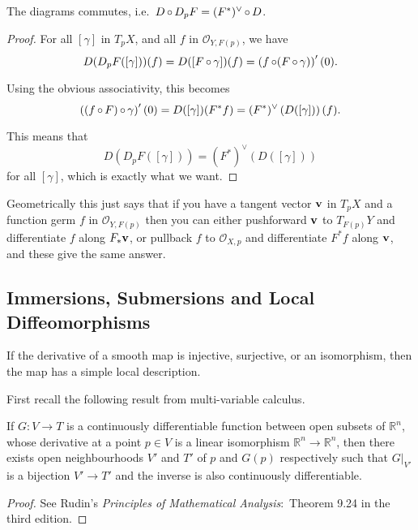 \documentclass[a4paper,11pt]{article}
\begin{document}
	\begin{lem}
		The diagrams commutes, i.e.\ $D \operatorname{\circ} D_p F = (F^*)^{\vee} \operatorname{\circ} D$.
	\end{lem}
	\begin{proof}
		For all $[\gamma]$ in $T_p X$, and all $f$ in $\mathcal{O}_{Y,F(p)}$, we have
		\[
			D(D_p F([\gamma])) (f) = D([F \operatorname{\circ} \gamma]) (f) = \left( f \operatorname{\circ} (F \operatorname{\circ} \gamma) \right)' (0).
		\]
		
		Using the obvious associativity, this becomes
		\[
			\left( (f \operatorname{\circ} F) \operatorname{\circ} \gamma \right)' (0) = D([\gamma]) (F^* f) = (F^*)^{\vee} \left( D([\gamma]) \right) (f).
		\]
		
		This means that
		\[
			D(D_p F([\gamma])) = (F^*)^{\vee} (D([\gamma]))
		\]
		for all $[\gamma]$, which is exactly what we want.
	\end{proof}

	Geometrically this just says that if you have a tangent vector $\vb v$ in $T_p X$ and a function germ $f$ in $\mathcal{O}_{Y,F(p)}$ then you can either pushforward $\vb v$ to $T_{F(p)}Y$ and differentiate $f$ along $F_* \vb v$, or pullback $f$ to $\mathcal{O}_{X,p}$ and differentiate $F^* f$ along $\vb v$, and these give the same answer. 

	\subsection{Immersions, Submersions and Local Diffeomorphisms} 

	If the derivative of a smooth map is injective, surjective, or an isomorphism, then the map has a simple local description.

	First recall the following result from multi-variable calculus.

	\begin{thm}
		If $G : V \to T$ is a continuously differentiable function between open subsets of $\mathbb{R}^n$, whose derivative at a point $p \in V$ is a linear isomorphism $\mathbb{R}^n \to \mathbb{R}^n$, then there exists open neighbourhoods $V'$ and $T'$ of $p$ and $G(p)$ respectively such that $G\big|_{V'}$ is a bijection $V' \to T'$ and the inverse is also continuously differentiable. 
	\end{thm}


	\begin{proof}
		See Rudin's \emph{Principles of Mathematical Analysis}:\ Theorem 9.24 in the third edition.
	\end{proof}
\end{document}
